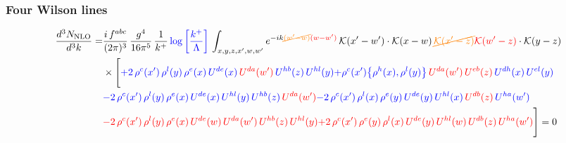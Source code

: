 \documentclass[9pt]{article}
\numberwithin{equation}{section}
\begin{document}
\subsubsection{Four Wilson lines}
\begin{align}
    \frac{d^{3}N_{\rm NLO}}{d^{3}k}= & \frac{i\,f^{abc}}{(2\pi)^{3}}\,\frac{g^{4}}{16\pi^{5}}\,\frac{1}{k^{+}}\,{\color{blue}\log{\left[\frac{k^{+}}{\Lambda}\right]}}\,\int_{x,y,z,x',w,w'}e^{-ik{\color{orange}\cancel{(w'-w)}}{\color{red}(w-w')}}\,\mathcal{K}(x'-w')\cdot\mathcal{K}(x-w)\,{\color{orange}\cancel{\mathcal{K}(x'-z)}}{\color{red}\mathcal{K}(w'-z)}\cdot\mathcal{K}(y-z)\notag \\ & \times\Bigg[{\color{blue}+2\,\rho^{c}(x')\,\rho^{l}(y)\,\rho^{e}(x)\,U^{de}(x)\,{\color{red}U^{da}(w')}\,U^{hb}(z)\,U^{hl}(y)}{\color{blue}+\rho^{c}(x')\big\{\rho^{h}(x),\rho^{l}(y)\big\}\,{\color{red}U^{da}(w')}\,{\color{red}U^{eb}(z)}\,U^{dh}(x)\,U^{el}(y)}\notag \\ & {\color{blue}-2\,\rho^{c}(x')\,\rho^{l}(y)\,\rho^{e}(x)\,U^{de}(x)\,U^{hl}(y)\,U^{hb}(z)\,{\color{red}U^{da}(w')}}{\color{blue}-2\,\rho^{c}(x')\,\rho^{l}(x)\,\rho^{e}(y)\,U^{de}(y)\,U^{hl}(x)\,{\color{red}U^{db}(z)}\,U^{ha}(w')}\notag \\ & {\color{red}-2\,\rho^{c}(x')\,\rho^{l}(y)\,\rho^{e}(x)\,U^{de}(w)\,{\color{red}U^{da}(w')}\,U^{hb}(z)\,U^{hl}(y)}{\color{red}+2\,\rho^{c}(x')\,\rho^{e}(y)\,\rho^{l}(x)\,U^{de}(y)\,U^{hl}(w)\,U^{db}(z)\,U^{ha}(w')}\Bigg] = 0
\end{align}
\end{document}
